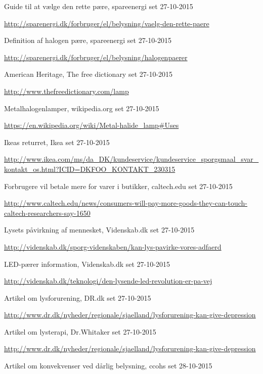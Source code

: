 \begin{thebibliography}{99}
  Guide til at vælge den rette pære,
  spareenergi
  set 27-10-2015
  
  \url{http://sparenergi.dk/forbruger/el/belysning/vaelg-den-rette-paere}

  Definition af halogen pære,
  spareenergi
  set 27-10-2015
  
  \url{http://sparenergi.dk/forbruger/el/belysning/halogenpaerer}

  American Heritage,
  The free dictionary
  set 27-10-2015
  
  \url{http://www.thefreedictionary.com/lamp}

  Metalhalogenlamper,
  wikipedia.org
  set 27-10-2015
  
  \url{https://en.wikipedia.org/wiki/Metal-halide_lamp#Uses}

  Ikeas returret,
  Ikea
  set 27-10-2015
  
  \url{http://www.ikea.com/ms/da_DK/kundeservice/kundeservice_sporgsmaal_svar_kontakt_os.html?ICID=DKFOO_KONTAKT_230315}


  Forbrugere vil betale mere for varer i butikker,
  caltech.edu
  set 27-10-2015
  
  \url{http://www.caltech.edu/news/consumers-will-pay-more-goods-they-can-touch-caltech-researchers-say-1650}

  Lysets påvirkning af mennesket,
  Videnskab.dk
  set 27-10-2015
  
  \url{http://videnskab.dk/sporg-videnskaben/kan-lys-pavirke-vores-adfaerd}

  LED-pærer information,
  Videnskab.dk
  set 27-10-2015
  
  \url{http://videnskab.dk/teknologi/den-lysende-led-revolution-er-pa-vej}

  Artikel om lysforurening,
  DR.dk
  set 27-10-2015
  
  \url{http://www.dr.dk/nyheder/regionale/sjaelland/lysforurening-kan-give-depression}

  Artikel om lysterapi,
  Dr.Whitaker
  set 27-10-2015
  
  \url{http://www.dr.dk/nyheder/regionale/sjaelland/lysforurening-kan-give-depression}

  Artikel om konvekvenser ved dårlig belysning,
  ccohs
  set 28-10-2015
  

\end{thebibliography}
